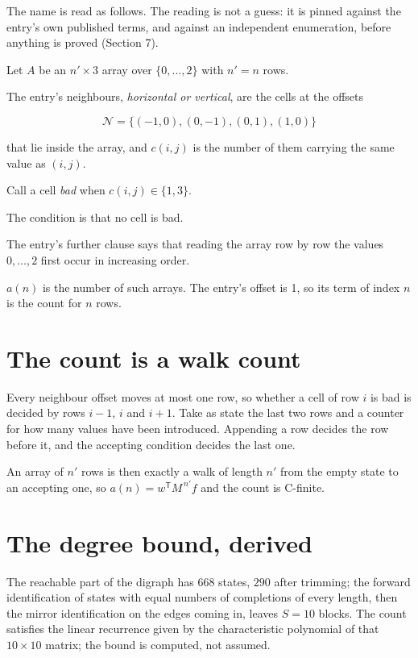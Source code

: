 \documentclass[11pt]{article}
\theoremstyle{definition}
\begin{document}
The name is read as follows. The reading is not a guess: it is pinned against the entry's own published terms, and against an independent enumeration, before anything is proved (Section 7).

Let $A$ be an $n' \times 3$ array over $\{0,\dots,2\}$ with $n' = n$ rows.

The entry's neighbours, {\itshape horizontal or vertical}, are the cells at the offsets

\[\mathcal{N} = \{(-1,0), (0,-1), (0,1), (1,0)\}\]

that lie inside the array, and $c(i,j)$ is the number of them carrying the same value as $(i,j)$.

Call a cell {\itshape bad} when $c(i,j) \in \{1, 3\}$.

The condition is that no cell is bad.

The entry's further clause says that reading the array row by row the values $0,\dots,2$ first occur in increasing order.

$a(n)$ is the number of such arrays. The entry's offset is 1, so its term of index $n$ is the count for $n$ rows.

\section{The count is a walk count}

Every neighbour offset moves at most one row, so whether a cell of row $i$ is bad is decided by rows $i-1$, $i$ and $i+1$. Take as state the last two rows and a counter for how many values have been introduced. Appending a row decides the row before it, and the accepting condition decides the last one.

An array of $n'$ rows is then exactly a walk of length $n'$ from the empty state to an accepting one, so $a(n) = w^{\mathsf T}M^{\,n'}f$ and the count is C-finite.

\section{The degree bound, derived}

The reachable part of the digraph has $668$ states, $290$ after trimming; the forward identification of states with equal numbers of completions of every length, then the mirror identification on the edges coming in, leaves $S = 10$ blocks. The count satisfies the linear recurrence given by the characteristic polynomial of that $10\times10$ matrix; the bound is computed, not assumed.
\end{document}
